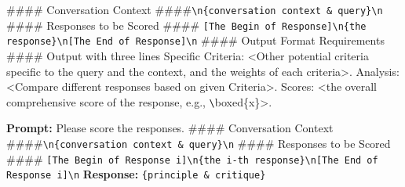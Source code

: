 \documentclass{article} %
\newcommand{\SGRMAll}{DeepSeek-GRM\xspace}
\begin{document}
\begin{tcolorbox}[title={\SGRMAll (Training on Rating Single Response)}, colbacktitle=blue!50!white, coltitle=white, fonttitle=\bfseries, colback=blue!10!white, boxrule=0pt, breakable]
\#\#\#\# Conversation Context \#\#\#\#\verb|\n|\verb|{conversation context & query}|\verb|\n|\newline
\#\#\#\# Responses to be Scored \#\#\#\#\newline
\verb|[The Begin of Response]\n{the response}\n[The End of Response]\n|
\newline
\#\#\#\# Output Format Requirements \#\#\#\#\newline\newline
Output with three lines\newline
Specific Criteria: <Other potential criteria specific to the query and the context, and the weights of each criteria>.\newline
Analysis: <Compare different responses based on given Criteria>.\newline
Scores: <the overall comprehensive score of the response, e.g., \verb|\|boxed\{x\}>. 
\end{tcolorbox}

\begin{tcolorbox}[title={Meta RM}, colbacktitle=blue!50!white, coltitle=white, fonttitle=\bfseries, colback=blue!10!white, boxrule=0pt, breakable]
\small
\textbf{Prompt:}\newline
Please score the responses.
\newline\newline
\#\#\#\# Conversation Context \#\#\#\#\verb|\n|\verb|{conversation context & query}|\verb|\n|\newline
\#\#\#\# Responses to be Scored \#\#\#\#\newline
\verb|[The Begin of Response i]\n{the i-th response}\n[The End of Response i]\n|
\tcblower
\textbf{Response:}\newline
\verb|{principle & critique}|
\end{tcolorbox}
\end{document}
